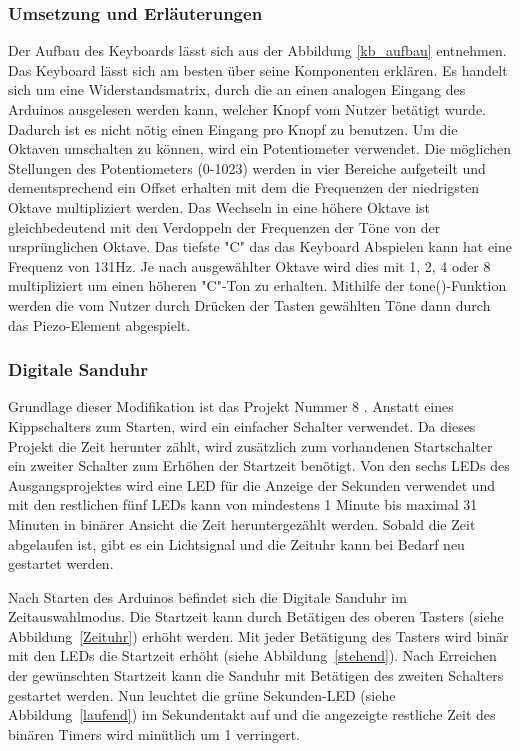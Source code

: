 \subsubsection{Umsetzung und Erläuterungen}
Der Aufbau des Keyboards lässt sich aus der Abbildung \ref{kb_aufbau} entnehmen.
Das Keyboard lässt sich am besten über seine Komponenten erklären.
Es handelt sich um eine Widerstandsmatrix, durch die an einen analogen Eingang des Arduinos ausgelesen werden kann,
welcher Knopf vom Nutzer betätigt wurde. Dadurch ist es nicht nötig einen Eingang pro Knopf zu benutzen.
Um die Oktaven umschalten zu können, wird ein Potentiometer verwendet.
Die möglichen Stellungen des Potentiometers (0-1023) werden in vier Bereiche aufgeteilt und 
dementsprechend ein Offset erhalten mit dem die Frequenzen der niedrigsten Oktave multipliziert werden.
Das Wechseln in eine höhere Oktave ist gleichbedeutend mit den Verdoppeln der Frequenzen der Töne von der ursprünglichen Oktave.
Das tiefste "C" das das Keyboard Abspielen kann hat eine Frequenz von 131Hz. Je nach ausgewählter Oktave wird dies mit 1, 2, 4 oder 8 multipliziert um einen höheren "C"-Ton zu erhalten.
Mithilfe der tone()-Funktion werden die vom Nutzer durch Drücken der Tasten gewählten Töne dann durch das Piezo-Element abgespielt.




\subsubsection{Digitale Sanduhr}
Grundlage dieser Modifikation ist das Projekt Nummer 8 \autocite{arduino}. Anstatt eines Kippschalters zum Starten, wird ein einfacher Schalter verwendet. Da dieses Projekt die Zeit herunter zählt, wird zusätzlich zum vorhandenen Startschalter ein zweiter Schalter zum Erhöhen der Startzeit benötigt. Von den sechs LEDs des Ausgangsprojektes wird eine LED für die Anzeige der Sekunden verwendet und mit den restlichen fünf LEDs kann von mindestens 1 Minute bis maximal 31 Minuten in binärer Ansicht die Zeit heruntergezählt werden. Sobald die Zeit abgelaufen ist, gibt es ein Lichtsignal und die Zeituhr kann bei Bedarf neu gestartet werden.

Nach Starten des Arduinos befindet sich die Digitale Sanduhr im Zeitauswahlmodus. Die Startzeit kann durch Betätigen des oberen Tasters (siehe Abbildung~\ref{Zeituhr}) erhöht werden. Mit jeder Betätigung des Tasters wird binär mit den LEDs die Startzeit erhöht (siehe Abbildung~\ref{stehend}). Nach Erreichen der gewünschten Startzeit kann die Sanduhr mit Betätigen des zweiten Schalters gestartet werden. Nun leuchtet die grüne Sekunden-LED (siehe Abbildung~\ref{laufend}) im Sekundentakt auf und die angezeigte restliche Zeit des binären Timers wird minütlich um 1 verringert.\\

